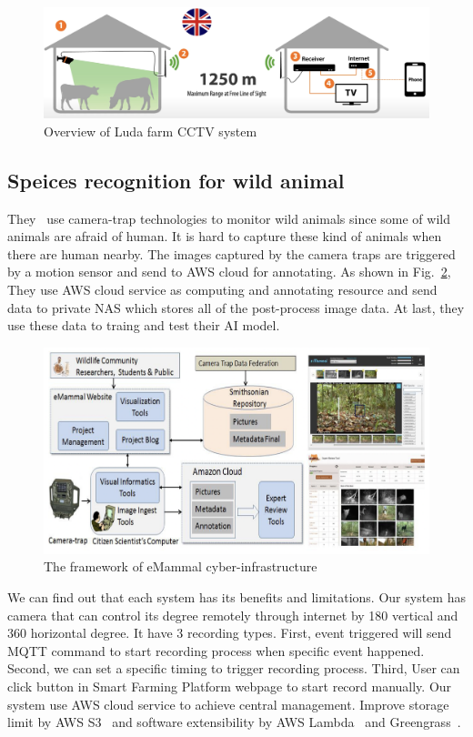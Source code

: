 \begin{figure}[H]
    \centering
    \includegraphics[width=\textwidth]{figsrc/Luda_farm_cctv.png}
    \caption{Overview of Luda farm CCTV system\label{fig:Luda_farm_cctv}}
\end{figure}

\subsection{Speices recognition for wild animal}
They~\cite{wildlife-paper} use camera-trap technologies to monitor wild animals since some of wild animals are afraid of human. It is hard to capture these kind of animals when there are human nearby. The images captured by the camera traps are triggered by a motion sensor and send to AWS cloud for annotating. As shown in Fig.~\ref{fig:wild-animal-paper-1}, They use AWS cloud service as computing and annotating resource and send data to private NAS  which stores all of the post-process image data. At last, they use these data to traing and test their AI model.

\begin{figure}[H]
    \centering
    \includegraphics[width=\textwidth]{figsrc/wild-animal-paper-1.png}
    \caption{The framework of eMammal cyber-infrastructure\label{fig:wild-animal-paper-1}}
\end{figure}


We can find out that each system has its benefits and limitations. Our system has camera that can control its degree remotely through internet by 180 vertical and 360 horizontal degree. It have 3 recording types. First, event triggered will send MQTT command to start recording process when specific event happened. Second, we can set a specific timing to trigger recording process. Third, User can click button in Smart Farming Platform webpage to start record manually. Our system use AWS cloud service to achieve central management. Improve storage limit by AWS S3~\cite{aws-s3} and software extensibility by AWS Lambda~\cite{aws-lambda} and Greengrass~\cite{aws-greengrass}.

